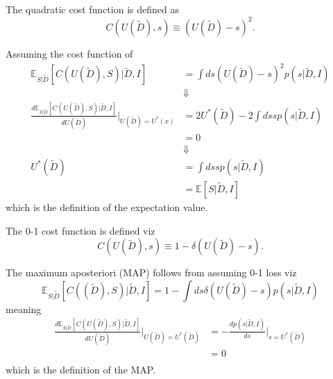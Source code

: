 \begin{definition}
	\label{def:quadratic_cost}
	The quadratic cost function is defined as
	\begin{equation}
		C(U(\tilde{D}),s) \equiv (U(\tilde{D})-s)^2.
	\end{equation}
\end{definition}

\begin{theorem}
	\label{theorem:expectation_decision_rule}
	Assuming the cost function of 
	\begin{equation}
		\begin{split}
			\mathbb{E}_{S|\tilde{D}}[C(U(\tilde{D}), S)|\tilde{D},I] &= \int ds (U(\tilde{D})-s)^2 p(s|\tilde{D},I)\\
			&\Downarrow\\
			\frac{d \mathbb{E}_{S|\tilde{D}}[C(U(\tilde{D}), S)|\tilde{D},I]}{dU(\tilde{D})}\bigg|_{U(\tilde{D})=U^*(x)} &= 2U^*(\tilde{D})-2\int ds sp(s|\tilde{D},I)\\
			&=0\\
			&\Downarrow\\
			U^*(\tilde{D})& = \int ds sp(s|\tilde{D},I)\\
			&= \mathbb{E}[S|\tilde{D},I]
		\end{split}
	\end{equation}
	which is the definition of the expectation value.
\end{theorem}

\begin{definition}
	\label{def:0_1_cost_function}
	The 0-1 cost function is defined viz
	\begin{equation}
		C(U(\tilde{D}),s) \equiv 1-\delta(U(\tilde{D})-s).
	\end{equation}
\end{definition}

\begin{theorem}
	\label{theorem:MAP}
	The maximum aposteriori (MAP) follows from assuming 0-1 loss viz
	\begin{equation}
		\mathbb{E}_{S|\tilde{D}}[C((\tilde{D}), S)|\tilde{D},I] = 1-\int ds \delta(U(\tilde{D})-s) p(s|\tilde{D},I)
	\end{equation}
	meaning
	\begin{equation}
		\begin{split}
			\frac{d \mathbb{E}_{S|\tilde{D}}[C(U(\tilde{D}), S)|\tilde{D},I]}{dU(\tilde{D})}\bigg|_{U(\tilde{D})=U^*(\tilde{D})} &= -\frac{dp(s|\tilde{D},I)}{ds}\bigg|_{s=U^*(\tilde{D})}\\
			&=0\\
		\end{split}
	\end{equation}
	which is the definition of the MAP.
\end{theorem}


